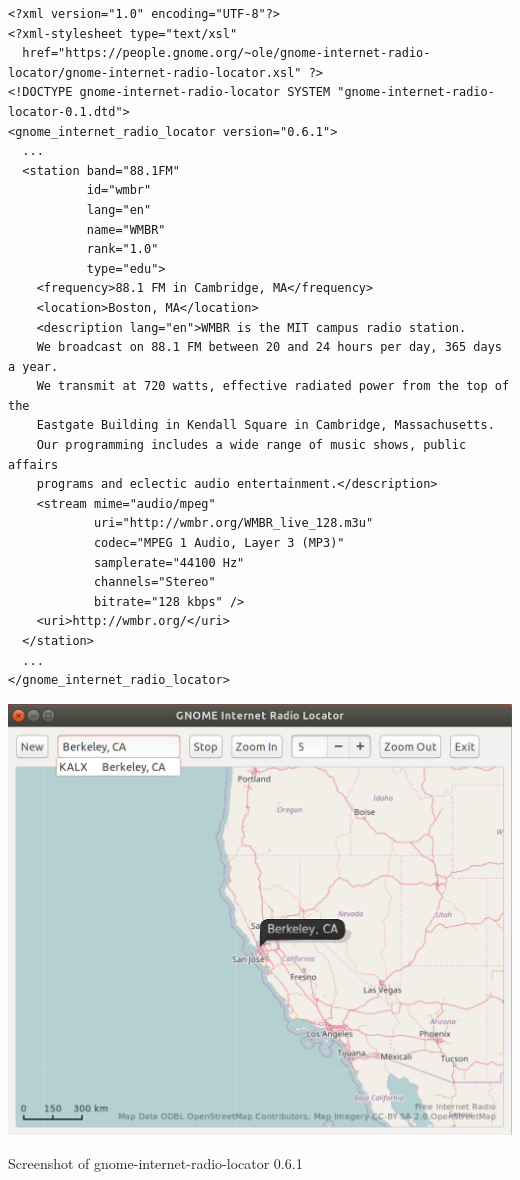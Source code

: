 \documentclass[20pt,landscape]{foils}
\begin{document}
\begin{tiny}
\begin{verbatim}
<?xml version="1.0" encoding="UTF-8"?>
<?xml-stylesheet type="text/xsl"
  href="https://people.gnome.org/~ole/gnome-internet-radio-locator/gnome-internet-radio-locator.xsl" ?>
<!DOCTYPE gnome-internet-radio-locator SYSTEM "gnome-internet-radio-locator-0.1.dtd">
<gnome_internet_radio_locator version="0.6.1">
  ...
  <station band="88.1FM"
           id="wmbr"
           lang="en"
           name="WMBR"
           rank="1.0"
           type="edu">
    <frequency>88.1 FM in Cambridge, MA</frequency>
    <location>Boston, MA</location>
    <description lang="en">WMBR is the MIT campus radio station.
    We broadcast on 88.1 FM between 20 and 24 hours per day, 365 days a year.
    We transmit at 720 watts, effective radiated power from the top of the
    Eastgate Building in Kendall Square in Cambridge, Massachusetts.
    Our programming includes a wide range of music shows, public affairs
    programs and eclectic audio entertainment.</description>
    <stream mime="audio/mpeg"
            uri="http://wmbr.org/WMBR_live_128.m3u"
            codec="MPEG 1 Audio, Layer 3 (MP3)"
            samplerate="44100 Hz"
            channels="Stereo"
            bitrate="128 kbps" />
    <uri>http://wmbr.org/</uri>
  </station>
  ...
</gnome_internet_radio_locator>
\end{verbatim}
\end{tiny}


\begin{center}

  \colorbox{white}{\includegraphics[width=0.6\hsize]{../data/screenshot.png}}

  {\blueem Screenshot of gnome-internet-radio-locator 0.6.1}

\end{center}
\end{document}
